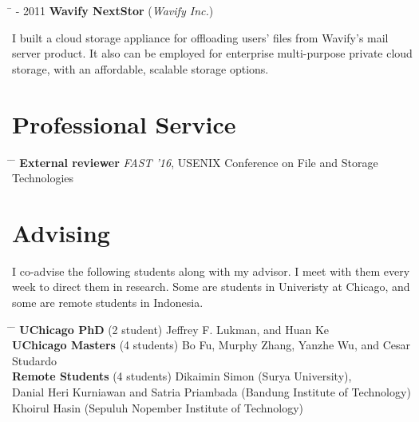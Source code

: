 \documentclass[10pt]{article} %
\begin{document}
\begin{tabbing}
\hspace{2.5cm} \=  - 2011 \>\+ \textbf{Wavify NextStor} (\textit{Wavify Inc.}) \\
\begin{minipage}{\smallertextwidth}
I built a cloud storage appliance for offloading users' files from Wavify's
mail server product. It also can be employed for enterprise multi-purpose
private cloud storage, with an affordable, scalable storage options.
\end{minipage}
\end{tabbing}


\newpage

\section{Professional Service}

\begin{tabbing}
\hspace{2.5cm} \= \hspace{3.5cm}  \=  \> \textbf{External reviewer} \> \textit{FAST '16}, USENIX Conference on File and Storage Technologies
\end{tabbing}


\section{Advising}

I co-advise the following students along with my advisor. I meet with them
every week to direct them in research. Some are students in Univeristy at
Chicago, and some are remote students in Indonesia.
\begin{tabbing}
\hspace{3.5cm} \= \hspace{2.5cm} \= \kill
\textbf{UChicago PhD} \> (2 student) \> Jeffrey F. Lukman, and Huan Ke\\
\textbf{UChicago Masters} \> (4 students) \> Bo Fu, Murphy Zhang, Yanzhe Wu, and Cesar Studardo\\
\textbf{Remote Students} \> (4 students) \> Dikaimin Simon (Surya University),\\
\> \>Danial Heri Kurniawan and Satria Priambada (Bandung Institute of Technology)\\
\> \>Khoirul Hasin (Sepuluh Nopember Institute of Technology)
\end{tabbing}
\end{document}
